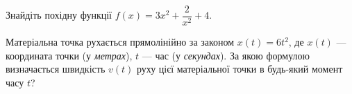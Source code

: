 \documentclass[12pt]{article}
\begin{document}
\begin{samepage}
\noindent\zadnum Знайдіть похідну функції $f(x) = 3x^2 + \dfrac{2}{x^2} + 4$. 
\par{}\vspace{0.25cm}
\end{samepage}

\begin{samepage}
\noindent\zadnum Матеріальна точка рухається прямолінійно за законом $x(t) = 6t^2$, де $x(t)$ — координата точки (у \textit{метрах}), $t$ — час (у \textit{секундах}). За якою формулою визначається швидкість $v(t)$ руху цієї матеріальної точки в будь-який момент часу $t$? 

\nmtnobreak
\nopagebreak\nbvspace{0.3cm}
\par{}
\end{samepage}
\end{document}
